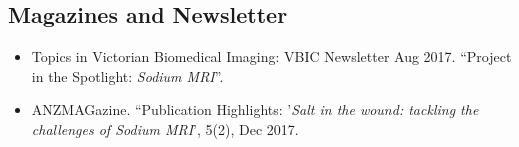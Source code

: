 \documentclass[11pt,a4paper]{book}
\begin{document}
	\subsection*{Magazines and Newsletter}
	\begin{itemize}
		\item {Topics in Victorian Biomedical Imaging: VBIC Newsletter Aug 2017. ``Project in the Spotlight: \emph{Sodium MRI}''}.
		\item {ANZMAGazine. ``Publication Highlights: '\emph{Salt in the wound: tackling the challenges of Sodium MRI}'}, 5(2), Dec 2017.
	\end{itemize}
	
	\blankpage \blankpage
	\tableofcontents {}
	\blankpage \blankpage
		
	\listoffigures  {} \clearpage
	
	\listoftables {} %

	
	
	
	
	\clearpage
	
	
\end{document}
